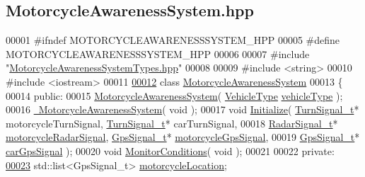 \hypertarget{MotorcycleAwarenessSystem_8hpp_source}{\subsection{Motorcycle\-Awareness\-System.\-hpp}
}

\begin{DoxyCode}
00001 \textcolor{preprocessor}{#ifndef MOTORCYCLEAWARENESSSYSTEM\_HPP}
00005 \textcolor{preprocessor}{}\textcolor{preprocessor}{#define MOTORCYCLEAWARENESSSYSTEM\_HPP}
00006 \textcolor{preprocessor}{}
00007 \textcolor{preprocessor}{#include "\hyperlink{MotorcycleAwarenessSystemTypes_8hpp}{MotorcycleAwarenessSystemTypes.hpp}"}
00008 
00009 \textcolor{preprocessor}{#include <string>}
00010 \textcolor{preprocessor}{#include <iostream>}
00011 
\hypertarget{MotorcycleAwarenessSystem_8hpp_source_l00012}{}\hyperlink{classMotorcycleAwarenessSystem}{00012} \textcolor{keyword}{class }\hyperlink{classMotorcycleAwarenessSystem}{MotorcycleAwarenessSystem}
00013 \{
00014     \textcolor{keyword}{public}:
00015         \hyperlink{classMotorcycleAwarenessSystem_ab0fb3823809dc056fecc82cc72a80a55}{MotorcycleAwarenessSystem}( \hyperlink{MotorcycleAwarenessSystemTypes_8hpp_a0c05c42b98a847f971385c81c2a81afa}{VehicleType} 
      \hyperlink{classMotorcycleAwarenessSystem_a977b2085bfbf6a62902bf2d80160e6d2}{vehicleType} );
00016         \hyperlink{classMotorcycleAwarenessSystem_a89ce16a722b3575e1415cbe9c7eedbd3}{~MotorcycleAwarenessSystem}( \textcolor{keywordtype}{void} );
00017         \textcolor{keywordtype}{void} \hyperlink{classMotorcycleAwarenessSystem_a826b6c2286c494c8aca3a47e6430b3ff}{Initialize}( \hyperlink{structTurnSignal__t}{TurnSignal\_t}* motorcycleTurnSignal, 
      \hyperlink{structTurnSignal__t}{TurnSignal\_t}* carTurnSignal,
00018                          \hyperlink{structRadarSignal__t}{RadarSignal\_t}* \hyperlink{classMotorcycleAwarenessSystem_a0744e71b9f440a86f5078c876ba7629b}{motorcycleRadarSignal}, 
      \hyperlink{structGpsSignal__t}{GpsSignal\_t}* \hyperlink{classMotorcycleAwarenessSystem_ab281a3993b574923b2f379ed0477b2d4}{motorcycleGpsSignal},
00019                          \hyperlink{structGpsSignal__t}{GpsSignal\_t}* \hyperlink{classMotorcycleAwarenessSystem_a9a8185e00b60d0be58bfa76166063128}{carGpsSignal} );
00020         \textcolor{keywordtype}{void} \hyperlink{classMotorcycleAwarenessSystem_afb19e832c17d43941d9ed6c4f4435a2e}{MonitorConditions}( \textcolor{keywordtype}{void} );
00021 
00022     \textcolor{keyword}{private}:
\hypertarget{MotorcycleAwarenessSystem_8hpp_source_l00023}{}\hyperlink{classMotorcycleAwarenessSystem_af6becfeb1d11b467cb80a94a8e6940ac}{00023}         std::list<GpsSignal\_t> \hyperlink{classMotorcycleAwarenessSystem_af6becfeb1d11b467cb80a94a8e6940ac}{motorcycleLocation}; 

\end{DoxyCode}
